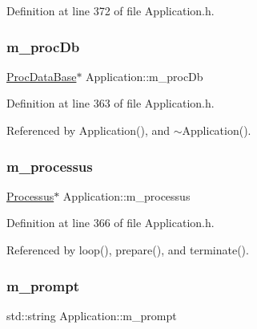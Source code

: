 Definition at line 372 of file Application.\+h.

\mbox{\label{classApplication_af030cefeb69586f01e965606d5dd8919}} 
\subsubsection{\texorpdfstring{m\+\_\+proc\+Db}{m\_procDb}}
{\footnotesize\ttfamily \hyperlink{classProcDataBase}{Proc\+Data\+Base}$\ast$ Application\+::m\+\_\+proc\+Db\hspace{0.3cm}{\ttfamily [private]}}



Definition at line 363 of file Application.\+h.



Referenced by Application(), and $\sim$\+Application().

\mbox{\label{classApplication_ab5eb4b3d3bef5ab9fce9c69401ce5786}} 
\subsubsection{\texorpdfstring{m\+\_\+processus}{m\_processus}}
{\footnotesize\ttfamily \hyperlink{classProcessus}{Processus}$\ast$ Application\+::m\+\_\+processus\hspace{0.3cm}{\ttfamily [private]}}



Definition at line 366 of file Application.\+h.



Referenced by loop(), prepare(), and terminate().

\mbox{\label{classApplication_a84f3f07f42ad77ad46cc8ef42d609948}} 
\subsubsection{\texorpdfstring{m\+\_\+prompt}{m\_prompt}}
{\footnotesize\ttfamily std\+::string Application\+::m\+\_\+prompt\hspace{0.3cm}{\ttfamily [protected]}}




